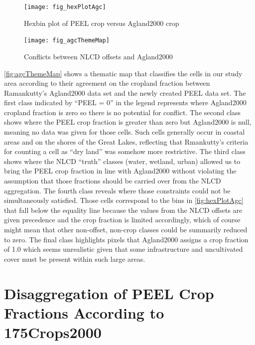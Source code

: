 \begin{figure}[ht] 
  \centering

    \texttt{[image: fig\_hexPlotAgc]}
  \caption{Hexbin plot of PEEL crop versus Agland2000 crop}
  \label{fig:hexPlotAgc} 
\end{figure} 



\begin{figure} 
  \centering


    \texttt{[image: fig\_agcThemeMap]}
  \caption{Conflicts between NLCD offsets and Agland2000}
  \label{fig:agcThemeMap} 
\end{figure} 


\autoref{fig:agcThemeMap} shows a thematic map that classifies the
cells in our study area according to their agreement on the cropland
fraction between Ramankutty's Agland2000 data set and the newly
created PEEL data set.  The first class indicated by ``PEEL = 0'' in
the legend represents where Agland2000 cropland fraction is zero so
there is no potential for conflict.  The second class shows where the
PEEL crop fraction is greater than zero but Agland2000 is null,
meaning no data was given for those cells.  Such cells generally occur
in coastal areas and on the shores of the Great Lakes, reflecting that
Rmankutty's criteria for counting a cell as ``dry land'' was somehow
more restrictive.  The third class shows where the NLCD ``truth''
classes (water, wetland, urban) allowed us to bring the PEEL crop
fraction in line with Agland2000 without violating the assumption that
those fractions should be carried over from the NLCD aggregation.  The
fourth class reveals where those constraints could not be
simultaneously satisfied.  Those cells correspond to the bins in
\autoref{fig:hexPlotAgc} that fall below the equality line because the
values from the NLCD offsets are given precedence and the crop
fraction is limited accordingly, which of course might mean that other
non-offset, non-crop classes could be summarily reduced to zero.  The
final class highlights pixels that Agland2000 assigns a crop fraction
of 1.0 which seems unrealistic given that some infrastructure and
uncultivated cover must be present within such large areas.

\section{Disaggregation of PEEL Crop Fractions According to 175Crops2000}
\label{sec:peel}






